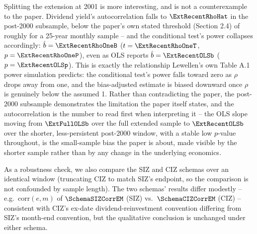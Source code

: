 \documentclass[11pt]{article}
\newcommand{\PathToOutput}{../_output}
\begin{document}
\begin{table}[H]
\centering

\caption{Extension, \ExtFullWindow{} (CIZ panel): the full sample carried
past the paper's original cutoff. Compare the OLS and \(\rho \approx 1\)
\(p\)-value rows -- the pattern the paper is built around, Stambaugh
failing to reject where the conditional test rejects decisively, should
still be visible here.}
\label{tab:table-ext-1946}
\end{table}

Splitting the extension at 2001 is more interesting, and is not a
counterexample to the paper. Dividend yield's autocorrelation falls to
\(\ExtRecentRhoHat\) in the post-2000 subsample, below the paper's own
stated threshold (Section 2.4) of roughly \RhoThreshold{} for a 25-year monthly sample
-- and the conditional test's power collapses accordingly: \(\hat b =
\ExtRecentRhoOneB\) (\(t = \ExtRecentRhoOneT\), \(p = \ExtRecentRhoOneP\)),
even as OLS reports \(\hat b = \ExtRecentOLSb\) (\(p = \ExtRecentOLSp\)).
This is exactly the relationship Lewellen's own Table A.1 power simulation
predicts: the conditional test's power falls toward zero as \(\rho\) drops
away from one, and the bias-adjusted estimate is biased downward once
\(\rho\) is genuinely below the assumed 1. Rather than contradicting the
paper, the post-2000 subsample demonstrates the limitation the paper itself
states, and the autocorrelation is the number to read first when
interpreting it -- the OLS slope moving from \(\ExtFullOLSb\) over the full
extended sample to \(\ExtRecentOLSb\) over the shorter, less-persistent
post-2000 window, with a stable low \(p\)-value throughout, is the
small-sample bias the paper is about, made visible by the shorter sample
rather than by any change in the underlying economics.

\begin{table}[H]
\centering

\caption{Extension, 2001--present (CIZ panel): data the paper never saw.
The low \(\hat\rho\) row is the number to read first -- it sits below the
paper's own stated power threshold for a 25-year sample, so the \(\rho
\approx 1\) row's loss of significance here is the paper's stated
limitation playing out, not a contradiction of its result.}
\label{tab:table-ext-2001}
\end{table}

As a robustness check, we also compare the SIZ and CIZ schemas over an
identical \SchemaWindow{} window (truncating CIZ to match SIZ's endpoint,
so the comparison is not confounded by sample length). The two schemas'
results differ modestly -- e.g.\ \(\text{corr}(e,m)\) of
\(\SchemaSIZCorrEM\) (SIZ) vs.\ \(\SchemaCIZCorrEM\) (CIZ) -- consistent
with CIZ's ex-date dividend-reinvestment convention differing from SIZ's
month-end convention, but the qualitative conclusion is unchanged under
either schema.
\end{document}
